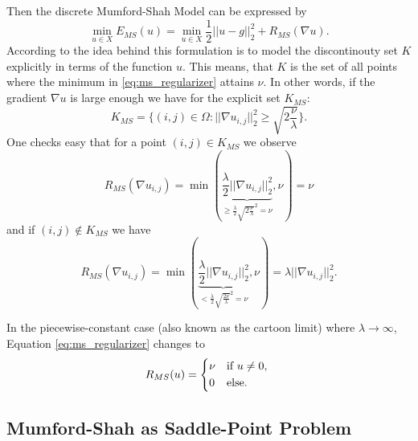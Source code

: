     Then the discrete Mumford-Shah Model can be expressed by
        \begin{equation}
            \min_{u \in X} E_{MS}(u) = \min_{u \in X} \frac{1}{2} ||u - g||_{2}^{2} + R_{MS}(\nabla u).
        \label{eq:discrete_mumford_shah_functional}
        \end{equation}
    According to \cite{Strekalovskiy-Cremers-eccv14} the idea behind this formulation is to model the discontinouty set $K$ explicitly in terms of the function $u$. This means, that $K$ is the set of all points where the minimum in \ref{eq:ms_regularizer} attains $\nu$. In other words, if the gradient $\nabla u$ is large enough we have for the explicit set $K_{MS}$:
        \begin{equation}
            K_{MS} = \bigg\{ (i, j) \in \Omega : ||\nabla u_{i, j}||_{2}^{2} \ge \sqrt{2 \frac{\nu}{\lambda}} \bigg\}.
        \label{eq:set_k_ms}
        \end{equation}
    One checks easy that for a point $(i, j) \in K_{MS}$ we observe
        $$
            R_{MS}(\nabla u_{i, j}) = \min(\underbrace{\frac{\lambda}{2}||\nabla u_{i, j}||_{2}^{2}}_{\ge \frac{\lambda}{2} \sqrt{2 \frac{\nu}{\lambda}}^{2} = \nu}, \nu) = \nu
        $$
    and if $(i, j) \notin K_{MS}$ we have
        $$
            R_{MS}(\nabla u_{i, j}) = \min(\underbrace{\frac{\lambda}{2}||\nabla u_{i, j}||_{2}^{2}}_{< \frac{\lambda}{2} \sqrt{\frac{2 \nu}{\lambda}}^{2} = \nu}, \nu) = \lambda||\nabla u_{i, j}||_{2}^{2}.
        $$

    \begin{remark}
        In the piecewise-constant case (also known as the cartoon limit) where $\lambda \longrightarrow \infty$, Equation \ref{eq:ms_regularizer} changes to
            \begin{equation}
                R_{MS}(u) = 
                    \begin{dcases*}
                        \nu & \textnormal{if $u \ne 0$,} \\
                        0 & \textnormal{else}.
                    \end{dcases*}
            \label{eq:ms_regularizer_piecewise_constant}
            \end{equation}
    \end{remark}

    \subsection{Mumford-Shah as Saddle-Point Problem} %
    \label{sub:mumford_shah_as_saddle_point_problem}


